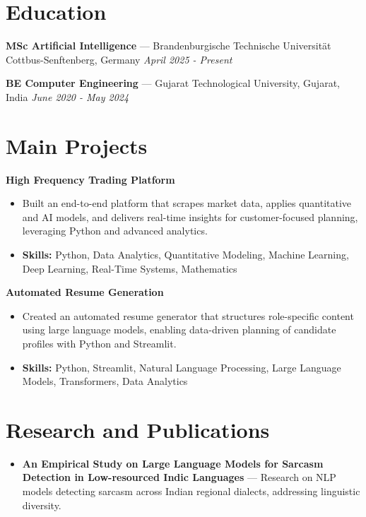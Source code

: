 \documentclass[a4paper,10pt]{article}
\begin{document}
\section*{Education}
\textbf{MSc Artificial Intelligence} — Brandenburgische Technische Universität Cottbus-Senftenberg, Germany \hfill \textit{April 2025 - Present}\par
\vspace{1.5pt}
\textbf{BE Computer Engineering} — Gujarat Technological University, Gujarat, India \hfill \textit{June 2020 - May 2024}\par

\section*{Main Projects}
\textbf{High Frequency Trading Platform}\par
\vspace{1pt}
\begin{itemize}
  \item Built an end-to-end platform that scrapes market data, applies quantitative and AI models, and delivers real-time insights for customer-focused planning, leveraging Python and advanced analytics.
  \item \textbf{Skills:} Python, Data Analytics, Quantitative Modeling, Machine Learning, Deep Learning, Real-Time Systems, Mathematics
\end{itemize}
\vspace{3pt}
\textbf{Automated Resume Generation}\par
\vspace{1pt}
\begin{itemize}
  \item Created an automated resume generator that structures role-specific content using large language models, enabling data-driven planning of candidate profiles with Python and Streamlit.
  \item \textbf{Skills:} Python, Streamlit, Natural Language Processing, Large Language Models, Transformers, Data Analytics
\end{itemize}

\section*{Research and Publications}
\begin{itemize}
\item \textbf{An Empirical Study on Large Language Models for Sarcasm Detection in Low-resourced Indic Languages} — Research on NLP models detecting sarcasm across Indian regional dialects, addressing linguistic diversity.
\end{itemize}
\end{document}
